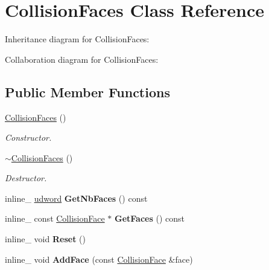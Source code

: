 \hypertarget{class_collision_faces}{\section{Collision\+Faces Class Reference}
\label{class_collision_faces}
}


Inheritance diagram for Collision\+Faces\+:


Collaboration diagram for Collision\+Faces\+:
\subsection*{Public Member Functions}
\begin{DoxyCompactItemize}
\item 
\hypertarget{class_collision_faces_a0761a58635aec8c24492a4b9497e68a6}{\hyperlink{class_collision_faces_a0761a58635aec8c24492a4b9497e68a6}{Collision\+Faces} ()}\label{class_collision_faces_a0761a58635aec8c24492a4b9497e68a6}

\begin{DoxyCompactList}\small\item\em Constructor. \end{DoxyCompactList}\item 
\hypertarget{class_collision_faces_a9b2944dc74e3315a4c9355fdedeeb556}{\hyperlink{class_collision_faces_a9b2944dc74e3315a4c9355fdedeeb556}{$\sim$\+Collision\+Faces} ()}\label{class_collision_faces_a9b2944dc74e3315a4c9355fdedeeb556}

\begin{DoxyCompactList}\small\item\em Destructor. \end{DoxyCompactList}\item 
\hypertarget{class_collision_faces_acdac7dbcfc09a49b05fc7b12363d69f6}{inline\+\_\+ \hyperlink{_ice_types_8h_a44c6f1920ba5551225fb534f9d1a1733}{udword} {\bfseries Get\+Nb\+Faces} () const }\label{class_collision_faces_acdac7dbcfc09a49b05fc7b12363d69f6}

\item 
\hypertarget{class_collision_faces_a1114d6ce1b79b39209d33db54152386f}{inline\+\_\+ const \hyperlink{class_collision_face}{Collision\+Face} $\ast$ {\bfseries Get\+Faces} () const }\label{class_collision_faces_a1114d6ce1b79b39209d33db54152386f}

\item 
\hypertarget{class_collision_faces_a14f7778792996117d2754eced0e22aaa}{inline\+\_\+ void {\bfseries Reset} ()}\label{class_collision_faces_a14f7778792996117d2754eced0e22aaa}

\item 
\hypertarget{class_collision_faces_a4e391dcd12f0930e630420d639687742}{inline\+\_\+ void {\bfseries Add\+Face} (const \hyperlink{class_collision_face}{Collision\+Face} \&face)}\label{class_collision_faces_a4e391dcd12f0930e630420d639687742}

\end{DoxyCompactItemize}


